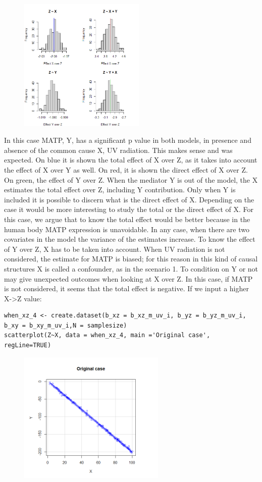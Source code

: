 \documentclass{article}
\begin{document}
\begin{figure}[h]
\includegraphics[width=6cm]{histsc2.png}
\centering
\end{figure}

In this case MATP, Y, has a significant p value in both models, in presence and absence of the common cause X, UV radiation. This makes sense and was expected.
On blue it is shown the total effect of X over Z, as it takes into account the effect of X over Y as well. On red, it is shown the direct effect of X over Z. On green, the effect of Y over Z. 
When the mediator Y is out of the model, the X estimates the total effect over Z, including Y contribution. Only when Y is included it is possible to discern what is the direct effect of X. Depending on the case it would be more interesting to study the total or the direct effect of X. For this case, we argue that to know the total effect would be better because in the human body MATP expression is unavoidable. In any case, when there are two covariates in the model the variance of the estimates increase.
To know the effect of Y over Z, X has to be taken into account. When UV radiation is not considered, the estimate for MATP is biased; for this reason in this kind of causal structures X is called a confounder, as in the scenario 1. 
To condition on Y or not may give unexpected outcomes when looking at X over Z. In this case, if MATP is not considered, it seems that the total effect is negative.
If we input a higher X->Z value:
\begin{lstlisting}
when_xz_4 <- create.dataset(b_xz = b_xz_m_uv_i, b_yz = b_yz_m_uv_i, b_xy = b_xy_m_uv_i,N = samplesize)
scatterplot(Z~X, data = when_xz_4, main ='Original case', regLine=TRUE)
\end{lstlisting}
\begin{figure}[h]
\includegraphics[width=7cm]{scatterplotOriginal.png}
\centering
\end{figure}
\end{document}
